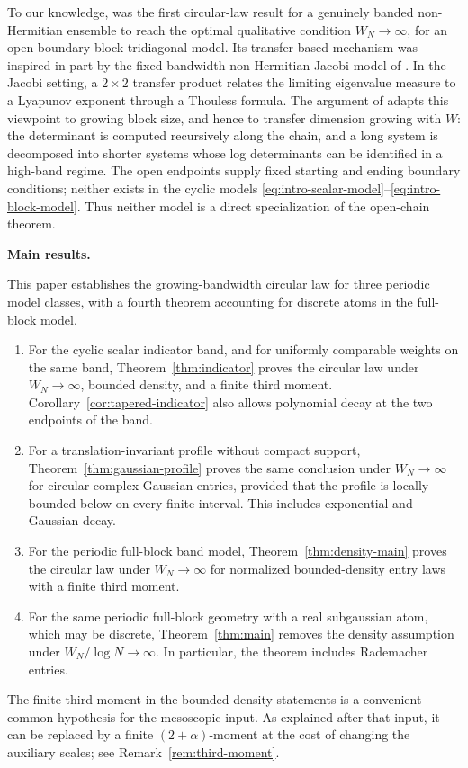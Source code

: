 \documentclass[11pt,reqno]{amsart}
\numberwithin{equation}{section}
\theoremstyle{definition}
\theoremstyle{remark}
\newcommand{\1}{\mathbf 1}
\newcommand{\introheading}[1]{%
  \par\medskip\noindent\textbf{#1.}\par\smallskip}
\begin{document}
To our knowledge, \cite{Han2511} was the first circular-law result for a
genuinely banded non-Hermitian ensemble to reach the optimal qualitative
condition \(W_N\to\infty\), for an open-boundary block-tridiagonal model.
Its transfer-based mechanism was inspired in part by the
fixed-bandwidth non-Hermitian Jacobi model of
\cite{GoldsheidKhoruzhenko2005}.  In the Jacobi setting, a
\(2\times2\) transfer product relates
the limiting eigenvalue measure to a Lyapunov exponent through a Thouless
formula.  The argument of \cite{Han2511} adapts this viewpoint to growing
block size, and hence to transfer dimension growing with \(W\): the
determinant is computed recursively along the chain, and a long system is
decomposed into shorter systems whose log determinants can be identified
in a high-band regime.  The open endpoints supply fixed starting and
ending boundary conditions; neither exists in the cyclic models
\eqref{eq:intro-scalar-model}--\eqref{eq:intro-block-model}.  Thus neither
model is a direct specialization of the open-chain theorem.


\introheading{Main results}
This paper establishes the growing-bandwidth circular law for three
periodic model classes, with a fourth theorem accounting for discrete
atoms in the full-block model.
\begin{enumerate}[leftmargin=2.1em]
 \item For the cyclic scalar indicator band, and for uniformly comparable
       weights on the same band, Theorem~\ref{thm:indicator} proves the
       circular law under \(W_N\to\infty\), bounded density, and a finite
       third moment.  Corollary~\ref{cor:tapered-indicator} also allows
       polynomial decay at the two endpoints of the band.
 \item For a translation-invariant profile without compact support,
       Theorem~\ref{thm:gaussian-profile} proves the same conclusion under
       \(W_N\to\infty\) for circular complex Gaussian entries, provided
       that the profile is locally bounded below on every finite interval.
       This includes exponential and Gaussian decay.
 \item For the periodic full-block band model, Theorem~\ref{thm:density-main}
       proves the circular law under \(W_N\to\infty\) for normalized
       bounded-density entry laws with a finite third moment. 
 \item For the same periodic full-block geometry with a real subgaussian
       atom, which may be discrete, Theorem~\ref{thm:main} removes the
       density assumption under \(W_N/\log N\to\infty\).  In particular,
       the theorem includes Rademacher entries.
\end{enumerate}
The finite third moment in the bounded-density statements is a convenient
common hypothesis for the mesoscopic input.  As explained after that
input, it can be replaced by a finite \((2+\alpha)\)-moment at the cost of
changing the auxiliary scales; see Remark~\ref{rem:third-moment}.
\end{document}
